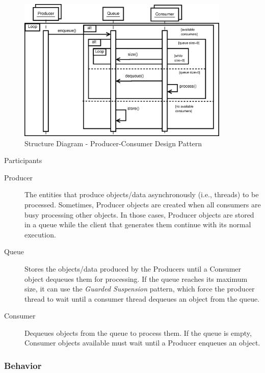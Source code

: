 \begin{figure}
	\centering
	\includegraphics*[width=0.9\textwidth, keepaspectratio=false]{fig/image12.eps}
	\caption{Structure Diagram - Producer-Consumer Design Pattern}
	\label{fig:str_diagram_pc}
\end{figure}

\begin{description}
	\item[Participants]
\end{description}

\begin{description}
	
	\item[Producer]
	The entities that produce objects/data asynchronously (i.e., threads) to be processed. Sometimes, Producer objects are created when all consumers are busy processing other objects. In those cases, Producer objects are stored in a queue while the client that generates them continue with its normal execution.
	
	\item[Queue]
	Stores the objects/data produced by the Producers until a Consumer object dequeues them for processing. If the queue reaches its maximum size, it can use the \textit{Guarded Suspension }pattern, which force the producer thread to wait until a consumer thread dequeues an object from the queue.
	
	\item[Consumer]
	Dequeues objects from the queue to process them. If the queue is empty, Consumer objects available must wait until a Producer enqueues an object.
	
\end{description}

\subsubsection{Behavior}


